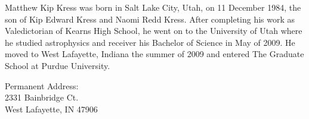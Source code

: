 %
%
%
%

\begin{vita}

Matthew Kip Kress was born in Salt Lake City, Utah, on 11 December 1984, the son of Kip Edward Kress and Naomi Redd Kress.  After completing his work as Valedictorian of Kearns High School, he went on to the University of Utah where he studied astrophysics and receiver his Bachelor of Science in May of 2009.  He moved to West Lafayette, Indiana the summer of 2009 and entered The Graduate School at Purdue University.

Permanent Address:\\
2331 Bainbridge Ct.\\
West Lafayette, IN 47906

\end{vita}
